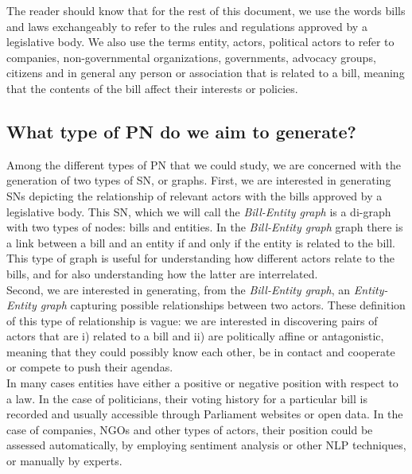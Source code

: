 The reader should know that for the rest of this document, we use the words bills and laws exchangeably to refer to the rules and regulations approved by a legislative body. We also use the terms entity, actors, political actors to refer to companies, non-governmental organizations, governments, advocacy groups, citizens and in general any person or association that is related to a bill, meaning that the contents of the bill affect their interests or policies. \\

\subsection{What type of PN do we aim to generate?}\label{subsec:objectives}

Among the different types of PN that we could study, we are concerned with the generation of two types of SN, or graphs. First, we are interested in generating SNs depicting the relationship of relevant actors with the bills approved by a legislative body. This SN, which we will call the \emph{Bill-Entity graph} is a di-graph with two types of nodes: bills and entities. In the \emph{Bill-Entity graph} graph there is a link between a bill and an entity if and only if the entity is related to the bill. This type of graph is useful for understanding how different actors relate to the bills, and for also understanding how the latter are interrelated.\\

Second, we are interested in generating, from the \emph{Bill-Entity graph}, an \emph{Entity-Entity graph} capturing possible relationships between two actors. These definition of this type of relationship is vague: we are interested in discovering pairs of actors that are i) related to a bill and ii) are politically affine or antagonistic, meaning that they could possibly know each other, be in contact and cooperate or compete to push their agendas. \\  

In many cases entities have either a positive or negative position with respect to a law. In the case of politicians, their voting history for a particular bill is recorded and usually accessible through Parliament websites or open data. In the case of companies, NGOs and other types of actors, their position could be assessed automatically, by employing sentiment analysis or other NLP techniques, or manually by experts. \\ 

